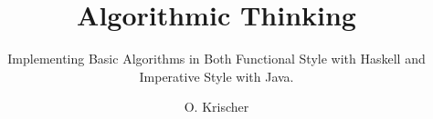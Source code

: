 \documentclass{scrbook}
\numberwithin{equation}{section}
\begin{document}
\hypersetup{hidelinks}

\title{Algorithmic Thinking}
\author{O. Krischer}
\subtitle{Implementing Basic Algorithms in Both Functional Style with Haskell and Imperative Style with Java.}

\frontmatter

\maketitle
\tableofcontents

\mainmatter





\appendix 
\printbibliography

\backmatter
\end{document}
